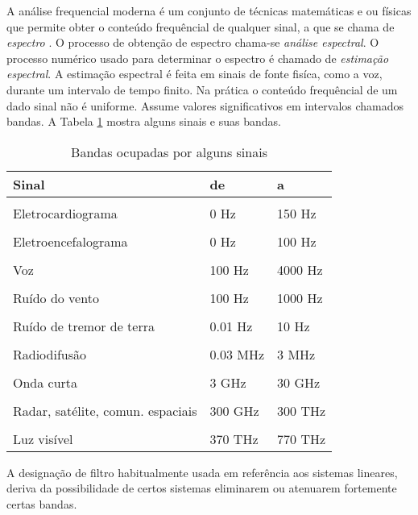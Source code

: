 A análise frequencial moderna é um conjunto de técnicas matemáticas e ou físicas que permite  obter o conteúdo frequêncial de qualquer sinal, a que se chama de \textit {espectro} . O processo de obtenção de espectro chama-se \textit {análise espectral}. O processo numérico usado para determinar o espectro é chamado de  \textit {estimação espectral}. A estimação espectral é feita em sinais de fonte fisíca, como a voz, durante um intervalo de tempo finito. Na prática o conteúdo frequêncial de um dado sinal não é uniforme. Assume valores significativos em intervalos chamados bandas.  A Tabela \ref{tab:banda}
mostra alguns sinais e suas bandas.

\begin{table}[H]
\centering
\caption{Bandas ocupadas por alguns sinais}
\label{tab:banda}
\smallskip
\begin{tabular}{|l|l|l|}
\hline
Sinal  & de & a\\[0.5ex]
\hline
&&\\[-2ex]
Eletrocardiograma& 0 Hz & 150 Hz \\[0.5ex]
\hline
&&\\[-2ex]
Eletroencefalograma& 0 Hz & 100 Hz\\[0.5ex]
\hline
&&\\[-2ex]
Voz & 100 Hz & 4000 Hz\\[0.5ex]
\hline
&&\\[-2ex]
Ruído do vento& 100 Hz &1000 Hz \\[0.5ex]
\hline
&&\\[-2ex]
Ruído de tremor de terra& 0.01 Hz& 10 Hz \\[0.5ex]
\hline
&&\\[-2ex]
Radiodifusão& 0.03 MHz& 3 MHz\\[0.5ex]
\hline
&&\\[-2ex]
Onda curta& 3 GHz & 30 GHz\\[0.5ex]
\hline
&&\\[-2ex]
Radar, satélite, comun. espaciais& 300 GHz & 300 THz \\[0.5ex]
\hline
&&\\[-2ex]
Luz visível& 370 THz& 770 THz \\[0.5ex]
\hline
\end{tabular}
\end{table}


 A designação de filtro habitualmente usada em referência aos sistemas lineares, deriva da possibilidade de certos sistemas eliminarem ou atenuarem fortemente certas bandas.



























